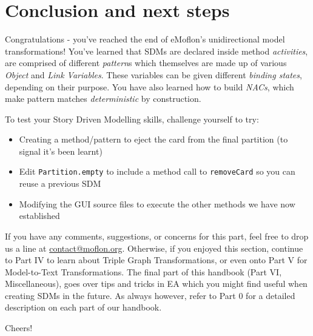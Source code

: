 \genHeader
\section{Conclusion and next steps}
\hypertarget{conclusion}{}

\vspace{0.5cm}

Congratulations - you've reached the end of eMoflon's unidirectional model transformations! You've learned that SDMs are declared inside method
\emph{activities}, are comprised of different \emph{pattern}s which themselves are made up of various \emph{Object} and \emph{Link Variables}. These
variables can be given different \emph{binding states}, depending on their purpose. You have also learned how to build \emph{NACs}, which make pattern
matches \emph{deterministic} by construction.

\vspace{0.5cm}

To test your Story Driven Modelling skills, challenge yourself to try:
\begin{itemize}
\item Creating a method/pattern to eject the card from the final partition (to signal it's been learnt)
\item Edit \texttt{Partition.empty} to include a method call to \texttt{removeCard} so you can reuse a previous SDM
\item Modifying the GUI source files to execute the other methods we have now established
\end{itemize}

\vspace{0.5cm}
	
If you have any comments, suggestions, or concerns for this part, feel free to drop us a line at \href{mailto:contact@moflon.org}{contact@moflon.org}.
Otherwise, if you enjoyed this section, continue to Part IV to learn about Triple Graph Transformations, or even onto Part V for Model-to-Text Transformations.
The final part of this handbook (Part VI, Miscellaneous), goes over tips and tricks in EA which you might find useful when creating SDMs in the future. As
always however, refer to Part 0 for a detailed description on each part of our handbook.

\vspace{0.5cm}


Cheers!
